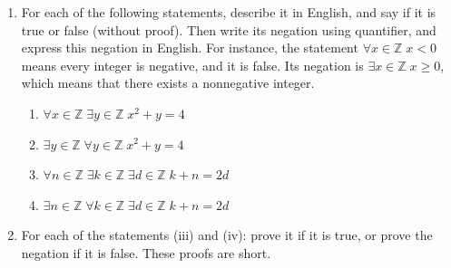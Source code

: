 \documentclass{article}
\newcommand{\Z}{\mathbb{Z}}
\theoremstyle{definition}
\begin{document}
\begin{question}
\begin{enumerate}
	\item For each of the following statements, describe it in English, and say if it is true or false (without proof). Then write its negation using quantifier, and express this negation in English. For instance, the statement $\forall x \in \Z \; x < 0$ means every integer is negative, and it is false. Its negation is $\exists x \in \Z \; x \geq 0$, which means that there exists a nonnegative integer.
	
	\begin{enumerate}
		\item $\forall x \in \Z \; \exists y \in \Z \; x^2 + y = 4$
		\item $\exists y \in \Z \; \forall y \in \Z \; x^2 + y = 4$
		\item $\forall n \in \Z \; \exists k \in \Z \; \exists d \in \Z \; k+ n = 2d$
		\item $\exists n \in \Z \; \forall k \in \Z \; \exists d \in \Z \; k+ n = 2d$
	\end{enumerate}
	
	\item For each of the statements (iii) and (iv): prove it if it is true, or prove the negation if it is false. These proofs are short.
\end{enumerate}
\end{question}
\end{document}
